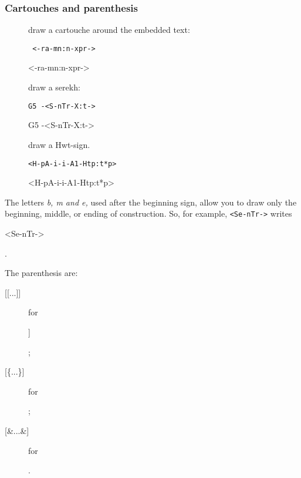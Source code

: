 \documentclass[final]{article}
\def\htimage#1{{#1\relax}}
\begin{document}
\subsubsection{Cartouches and parenthesis}

\begin{description}
\item[\tt <- and ->] draw a cartouche around the embedded text:
\begin{verbatim}
 <-ra-mn:n-xpr->
\end{verbatim}
  \begin{hieroglyph}
    <-ra-mn:n-xpr->
  \end{hieroglyph}

  
\item[\tt <S and >] draw a serekh: 
\begin{verbatim}
G5 -<S-nTr-X:t->
\end{verbatim}
  \begin{hieroglyph}
    G5 -<S-nTr-X:t->
  \end{hieroglyph}
  

\item[\tt <H >] draw a \htimage{\eg Hwt-}sign.
\begin{verbatim}
<H-pA-i-i-A1-Htp:t*p>
\end{verbatim}
  \begin{hieroglyph}
    <H-pA-i-i-A1-Htp:t*p>
  \end{hieroglyph}
\end{description}
The letters {\em b, m and e,} used after the beginning sign, allow you
to draw only the beginning, middle, or ending of construction. 
So, for example, 
\verb/<Se-nTr->/ writes
\begin{hieroglyph}
  <Se-nTr->
\end{hieroglyph}.

The parenthesis are:
\begin{description}
\item[{[[...]]}] for 
  \begin{hieroglyph}
    [[+l text +s ]]
  \end{hieroglyph};
\item[{[\{...\}]}] for 
  \begin{hieroglyph}
    ["+l text +s "]
  \end{hieroglyph};
\item[{[\&...\&]}] for 
  \begin{hieroglyph}
    [&+l text +s &]
  \end{hieroglyph}.
\end{description}
\end{document}
